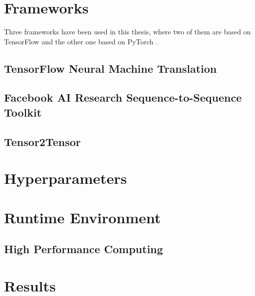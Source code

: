 \section{Frameworks} \label{section:frameworks}

Three frameworks have been used in this thesis, where two of them are based on TensorFlow \cite{tensorflow2015-whitepaper} and the other one based on PyTorch \cite{paszke2017automatic}.

\subsection{TensorFlow Neural Machine Translation}

\cite{luong17}

\subsection{Facebook AI Research Sequence-to-Sequence Toolkit}

\cite{gehring2017convs2s}

\subsection{Tensor2Tensor}

\cite{tensor2tensor}



\section{Hyperparameters} \label{section:model parameters}

\section{Runtime Environment} \label{section:runtime environment}

\subsection{High Performance Computing} \label{subsection:hpc}

\section{Results} \label{section:results}